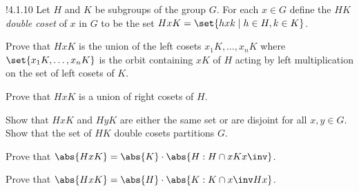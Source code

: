 \begin{exercise}!{4.1.10}
	Let $H$ and $K$ be subgroups of the group $G$.
	For each $x \in G$ define the $HK$ \emph{double coset} of $x$ in $G$ to be the set $HxK = \set{hxk \mid h \in H, k \in K}$.
	\begin{subexercises}
		\item Prove that $HxK$ is the union of the left cosets $x_1K, \ldots, x_nK$ where $\set{x_1K, \ldots, x_nK}$ is the orbit containing $xK$ of $H$ acting by left multiplication on the set of left cosets of $K$.
		\item Prove that $HxK$ is a union of right cosets of $H$.
		\item Show that $HxK$ and $HyK$ are either the same set or are disjoint for all $x, y \in G$.
		Show that the set of $HK$ double cosets partitions $G$.
		\item Prove that $\abs{HxK} = \abs{K} \cdot \abs{H : H \cap xKx\inv}$.
		\item Prove that $\abs{HxK} = \abs{H} \cdot \abs{K : K \cap x\inv Hx}$.
	\end{subexercises}
\end{exercise}

